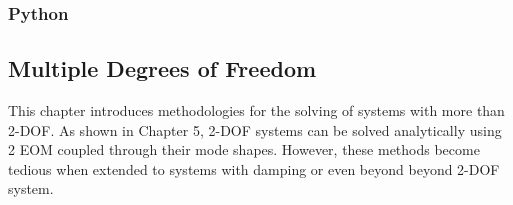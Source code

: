 \documentclass[12pt,letter]{article}
\numberwithin{ex}{section} %
\numberwithin{re}{section} %
\begin{document}
\subsubsection{Python}




\subsection{Multiple Degrees of Freedom}

This chapter introduces methodologies for the solving of systems with more than 2-DOF. As shown in Chapter 5, 2-DOF systems can be solved analytically using 2 EOM coupled through their mode shapes. However, these methods become tedious when extended to systems with damping or even beyond beyond 2-DOF system.
\end{document}
